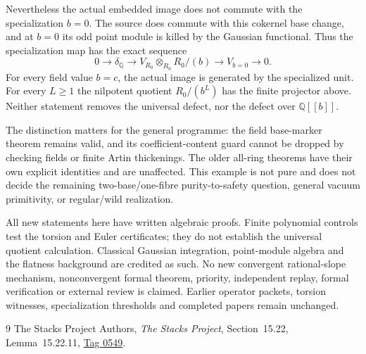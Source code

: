 \documentclass[11pt]{article}
\theoremstyle{definition}\newtheorem{definition}[theorem]{Definition}
\theoremstyle{remark}\newtheorem{remark}[theorem]{Remark}
\begin{document}
Nevertheless the actual embedded image does not commute with
the specialization $b=0$. The source does commute with this
cokernel base change, and at $b=0$ its odd point module is killed
by the Gaussian functional. Thus the specialization map has
the exact sequence
\[
 0\longrightarrow\delta_{\mathbb Q}
 \longrightarrow V_{R_0}\otimes_{R_0}R_0/(b)
 \longrightarrow V_{b=0}\longrightarrow0.
\]
For every field value $b=c$, the actual image is generated by
the specialized unit. For every $L\ge1$ the nilpotent quotient
$R_0/(b^L)$ has the finite projector above. Neither statement
removes the universal defect, nor the defect over $\mathbb Q[[b]]$.

The distinction matters for the general programme: the field
base-marker theorem remains valid, and its coefficient-content
guard cannot be dropped by checking fields or finite Artin
thickenings. The older all-ring theorems have their own explicit
identities and are unaffected. This example is not pure and
does not decide the remaining two-base/one-fibre purity-to-safety
question, general vacuum primitivity, or regular/wild realization.

All new statements here have written algebraic proofs. Finite
polynomial controls test the torsion and Euler certificates;
they do not establish the universal quotient calculation.
Classical Gaussian integration, point-module algebra and the
flatness background are credited as such. No new convergent
rational-slope mechanism, nonconvergent formal theorem,
priority, independent replay, formal verification or external
review is claimed. Earlier operator packets, torsion witnesses,
specialization thresholds and completed papers remain unchanged.

\begin{thebibliography}{9}
The Stacks Project Authors, \emph{The Stacks Project},
Section~15.22, Lemma~15.22.11,
\href{https://stacks.math.columbia.edu/tag/0549}{Tag 0549}.
\end{thebibliography}
\end{document}
